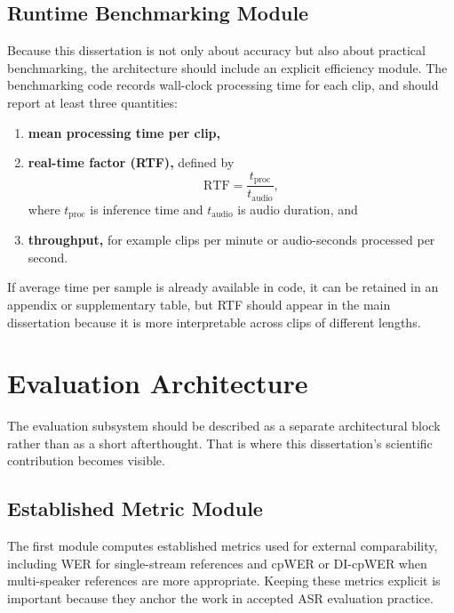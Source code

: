 \subsection{Runtime Benchmarking Module}
Because this dissertation is not only about accuracy but also about practical benchmarking, the architecture should include an explicit efficiency module. The benchmarking code records wall-clock processing time for each clip, and should report at least three quantities:
\begin{enumerate}
    \item \textbf{mean processing time per clip,}
    \item \textbf{real-time factor (RTF),} defined by
    \begin{equation}
    \mathrm{RTF} = \frac{t_{\mathrm{proc}}}{t_{\mathrm{audio}}},
    \end{equation}
    where $t_{\mathrm{proc}}$ is inference time and $t_{\mathrm{audio}}$ is audio duration, and
    \item \textbf{throughput,} for example clips per minute or audio-seconds processed per second.
\end{enumerate}
If average time per sample is already available in code, it can be retained in an appendix or supplementary table, but RTF should appear in the main dissertation because it is more interpretable across clips of different lengths.

\section{Evaluation Architecture}
The evaluation subsystem should be described as a separate architectural block rather than as a short afterthought. That is where this dissertation's scientific contribution becomes visible.

\subsection{Established Metric Module}
The first module computes established metrics used for external comparability, including WER for single-stream references and cpWER or DI-cpWER when multi-speaker references are more appropriate. Keeping these metrics explicit is important because they anchor the work in accepted ASR evaluation practice.

